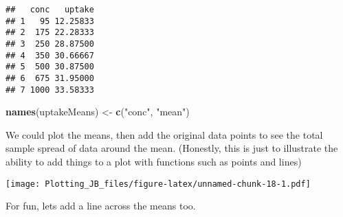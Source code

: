 \documentclass[]{article}
\newenvironment{Shaded}{\begin{snugshade}}{\end{snugshade}}
\newcommand{\CommentTok}[1]{\textcolor[rgb]{0.56,0.35,0.01}{\textit{#1}}}
\newcommand{\DataTypeTok}[1]{\textcolor[rgb]{0.13,0.29,0.53}{#1}}
\newcommand{\DecValTok}[1]{\textcolor[rgb]{0.00,0.00,0.81}{#1}}
\newcommand{\KeywordTok}[1]{\textcolor[rgb]{0.13,0.29,0.53}{\textbf{#1}}}
\newcommand{\NormalTok}[1]{#1}
\newcommand{\OperatorTok}[1]{\textcolor[rgb]{0.81,0.36,0.00}{\textbf{#1}}}
\newcommand{\StringTok}[1]{\textcolor[rgb]{0.31,0.60,0.02}{#1}}
\begin{document}
\begin{verbatim}
##   conc   uptake
## 1   95 12.25833
## 2  175 22.28333
## 3  250 28.87500
## 4  350 30.66667
## 5  500 30.87500
## 6  675 31.95000
## 7 1000 33.58333
\end{verbatim}

\begin{Shaded}
\begin{Highlighting}[]
\KeywordTok{names}\NormalTok{(uptakeMeans) <-}\StringTok{ }\KeywordTok{c}\NormalTok{(}\StringTok{"conc"}\NormalTok{, }\StringTok{"mean"}\NormalTok{)}
\end{Highlighting}
\end{Shaded}

We could plot the means, then add the original data points to see the
total sample spread of data around the mean. (Honestly, this is just to
illustrate the ability to add things to a plot with functions such as
points and lines)

\begin{Shaded}
\end{Shaded}

\texttt{[image: Plotting\_JB\_files/figure-latex/unnamed-chunk-18-1.pdf]}

For fun, lets add a line across the means too.
\end{document}

